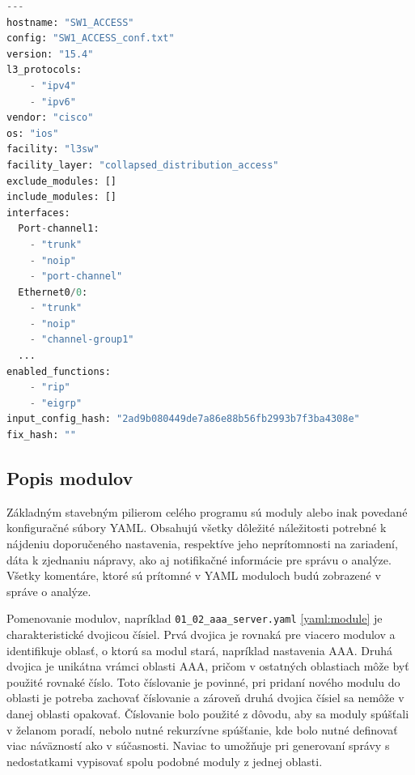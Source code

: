 \newpage
\begin{lstlisting}[frame=single,numbers=right,caption={Konfiguračný súbor \texttt{device\_info.yaml}, ktorý popisuje základné informácie o~jednom konkrétnom zariadení},label=yaml:device_info,basicstyle=\ttfamily\small\linespread{0.8}, keywordstyle=\color{black},language=python,breaklines=true]
---
hostname: "SW1_ACCESS"
config: "SW1_ACCESS_conf.txt" 
version: "15.4" 
l3_protocols:
	- "ipv4"
	- "ipv6"
vendor: "cisco"
os: "ios" 
facility: "l3sw" 
facility_layer: "collapsed_distribution_access" 
exclude_modules: []
include_modules: []
interfaces:
  Port-channel1:
	- "trunk"
	- "noip"
	- "port-channel"
  Ethernet0/0:
	- "trunk"
	- "noip"
	- "channel-group1"
  ...  
enabled_functions:
	- "rip"
	- "eigrp"
input_config_hash: "2ad9b080449de7a86e88b56fb2993b7f3ba4308e"
fix_hash: ""

\end{lstlisting}

 \newpage

\subsection{Popis modulov}
\label{module}
Základným stavebným pilierom celého programu sú moduly alebo inak povedané konfiguračné súbory YAML. Obsahujú všetky dôležité náležitosti potrebné k nájdeniu doporučeného nastavenia, respektíve jeho neprítomnosti na zariadení, dáta k zjednaniu nápravy, ako aj notifikačné informácie pre správu o analýze. Všetky komentáre, ktoré sú prítomné v YAML moduloch budú zobrazené v správe o analýze.

Pomenovanie modulov, napríklad \texttt{01\_02\_aaa\_server.yaml} \ref{yaml:module} je charakteristické dvojicou čísiel. Prvá dvojica je rovnaká pre viacero modulov a identifikuje oblasť, o ktorú sa modul stará, napríklad nastavenia AAA. Druhá dvojica je unikátna vrámci oblasti AAA, pričom v ostatných oblastiach môže byť použité rovnaké číslo. Toto číslovanie je povinné, pri pridaní nového modulu do oblasti je potreba zachovať číslovanie a zároveň druhá dvojica čísiel sa nemôže v danej oblasti opakovať. Číslovanie bolo použité z dôvodu, aby sa moduly spúšťali v želanom poradí, nebolo nutné rekurzívne spúšťanie, kde bolo nutné definovať viac náväzností ako v súčasnosti. Naviac to umožňuje pri generovaní správy s nedostatkami vypisovať spolu podobné moduly z jednej oblasti.\\  


